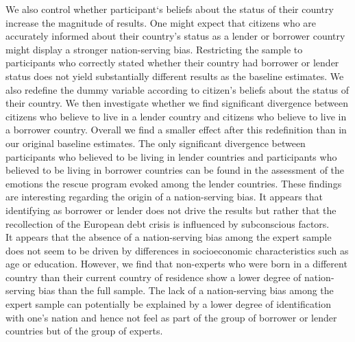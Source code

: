 We also control whether participant`s beliefs about the status of their country increase the magnitude of results. One might expect that citizens who are accurately informed about their country's status as a lender or borrower country might display a stronger nation-serving bias. Restricting the sample to participants who correctly stated whether their country had borrower or lender status does not yield substantially different results as the baseline estimates. We also redefine the dummy variable according to citizen's beliefs about the status of their country. We then investigate whether we find significant divergence between citizens who believe to live in a lender country and citizens who believe to live in a borrower country. Overall we find a smaller effect after this redefinition than in our original baseline estimates. The only significant divergence between participants who believed to be living in lender countries and participants who believed to be living in borrower countries can be found in the assessment of the emotions the rescue program evoked among the lender countries. These findings are interesting regarding the origin of a nation-serving bias. It appears that identifying as borrower or lender does not drive the results but rather that the recollection of the European debt crisis is influenced by subconscious factors. 
\\
It appears that the absence of a nation-serving bias among the expert sample does not seem to be driven by differences in socioeconomic characteristics such as age or education.  However, we find that non-experts who were born in a different country than their current country of residence show a lower degree of nation-serving bias than the full sample. The lack of  a nation-serving bias among the expert sample can potentially be explained by a lower degree of identification with one's nation and hence not feel as part of the group of borrower or lender countries but of the group of experts. 

